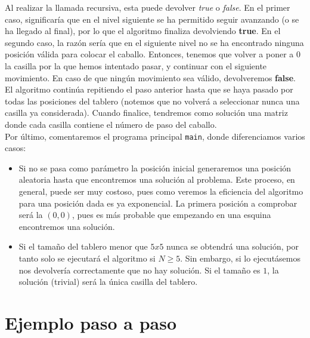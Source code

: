 \documentclass[11pt]{article}
\begin{document}
Al realizar la llamada recursiva, esta puede devolver \textit{true} o \textit{false}. En el primer caso, significaría que en el nivel siguiente se  ha permitido seguir avanzando (o se ha llegado al final), por lo que el algoritmo finaliza devolviendo \textbf{true}. En el segundo caso, la razón sería que en el siguiente nivel no se ha encontrado ninguna posición válida para colocar el caballo. Entonces, tenemos que volver a poner a $0$ la casilla por la que hemos intentado pasar, y continuar con el siguiente movimiento. En caso de que ningún movimiento sea válido, devolveremos \textbf{false}.\\

El algoritmo continúa repitiendo el paso anterior hasta que se haya pasado por todas las posiciones del tablero (notemos que no volverá a seleccionar nunca una casilla ya considerada). Cuando finalice, tendremos como solución una matriz donde cada casilla contiene el número de paso del caballo.\\




Por último, comentaremos el programa principal \verb|main|, donde diferenciamos varios casos:
\begin{itemize}
	\item Si no se pasa como parámetro la posición inicial generaremos una posición aleatoria hasta que encontremos una solución al problema. Este proceso, en general, puede ser muy costoso, pues como veremos la eficiencia del algoritmo para una posición dada es ya exponencial. La primera posición a comprobar será la $(0,0)$, pues es más probable que empezando en una esquina encontremos una solución.
	\item Si el tamaño del tablero menor que $5x5$ nunca se obtendrá una solución, por tanto solo se ejecutará el algoritmo si $N\ge5$. Sin embargo, si lo ejecutásemos nos devolvería correctamente que no hay solución. Si el tamaño es $1$, la solución (trivial) será la única casilla del tablero.
\end{itemize}


\section*{Ejemplo paso a paso}

\end{document}
